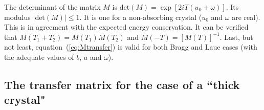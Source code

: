 \documentclass{iucr}
\begin{document}
The determinant of the matrix $M$ is 
$\text{det}(M)=\exp[2 i T (u_0+\omega)]$. Its modulus $|\text{det}(M)|\le 1$. It is one for a non-absorbing crystal ($u_0$ and $\omega$ are real).
This is in agreement with the expected energy conservation.
It can be verified that $M(T_1+T_2)=M(T_1) M(T_2)$ and $M(-T)=[M(T)]^{-1}$. Last, but not least, equation~(\ref{eq:Mtransfer}) is valid for both Bragg and Laue cases (with the adequate values of $b$, $a$ and $\omega$).

\subsection{The transfer matrix for the case of a ``thick crystal"}
\label{sec:Mthick}
\end{document}
